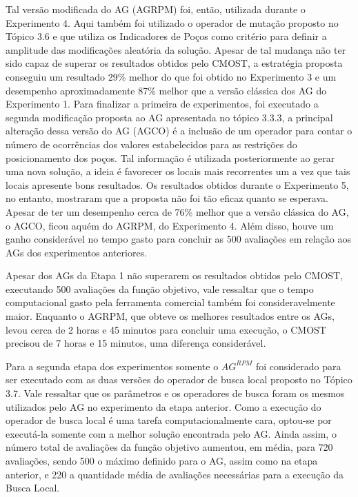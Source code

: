 Tal versão modificada do AG (AGRPM) foi, então, utilizada durante o Experimento 4. Aqui também foi utilizado o operador de mutação proposto no Tópico 3.6 e que utiliza os Indicadores de Poços como critério para definir a amplitude das modificações aleatória da solução. Apesar de tal mudança não ter sido capaz de superar os resultados obtidos pelo CMOST, a estratégia proposta conseguiu um resultado 29\% melhor do que foi obtido no Experimento 3 e um desempenho aproximadamente 87\% melhor que a versão clássica dos AG do Experimento 1. Para finalizar a primeira de experimentos, foi executado a segunda modificação proposta ao AG apresentada no tópico 3.3.3, a principal alteração dessa versão do AG (AGCO) é a inclusão de um operador para contar o número de ocorrências dos valores estabelecidos para as restrições do posicionamento dos poços. Tal informação é utilizada posteriormente ao gerar uma nova solução, a ideia é favorecer os locais mais recorrentes um a vez que tais locais apresente bons resultados. Os resultados obtidos durante o Experimento 5, no entanto, mostraram que a proposta não foi tão eficaz quanto se esperava. Apesar de ter um desempenho cerca de 76\% melhor que a versão clássica do AG, o AGCO, ficou aquém do AGRPM, do Experimento 4. Além disso, houve um ganho considerável no tempo gasto para concluir as 500 avaliações em relação aos AGs dos experimentos anteriores.

Apesar dos AGs da Etapa 1 não superarem os resultados obtidos pelo CMOST, executando 500 avaliações da função objetivo, vale ressaltar que o tempo computacional gasto pela ferramenta comercial também foi consideravelmente maior. Enquanto o AGRPM, que obteve os melhores resultados entre os AGs, levou cerca de 2 horas e 45 minutos para concluir uma execução, o CMOST precisou de 7 horas e 15 minutos, uma diferença considerável.

Para a segunda etapa dos experimentos somente o $AG^{RPM}$ foi considerado para ser executado com as duas versões do operador de busca local proposto no Tópico 3.7. Vale ressaltar que os parâmetros e os operadores de busca foram os mesmos utilizados pelo AG no experimento da etapa anterior. Como a execução do operador de busca local é uma tarefa computacionalmente cara, optou-se por executá-la somente com a melhor solução encontrada pelo AG. Ainda assim, o número total de avaliações da função objetivo aumentou, em média, para 720 avaliações, sendo 500 o máximo definido para o AG, assim como na etapa anterior, e 220 a quantidade média de avaliações necessárias para a execução da Busca Local.

